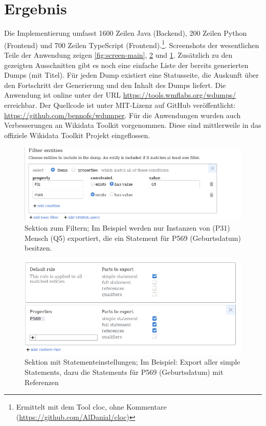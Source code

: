 \section{Ergebnis}
Die Implementierung umfasst 1600 Zeilen Java (Backend), 200 Zeilen Python (Frontend) und 700 Zeilen TypeScript (Frontend).\footnote{Ermittelt mit dem Tool cloc, ohne Kommentare (\url{https://github.com/AlDanial/cloc})}.
Screenshots der wesentlichen Teile der Anwendung zeigen \cref{fig:screen-main}, \cref{fig:screen-statements} und \cref{fig:screen-filter}.
Zusätzlich zu den gezeigten Ausschnitten gibt es noch eine einfache Liste der bereits generierten Dumps (mit Titel).
Für jeden Dump existiert eine Statusseite, die Auskunft über den Fortschritt der Generierung und den Inhalt des Dumps liefert.
Die Anwendung ist online unter der URL \url{https://tools.wmflabs.org/wdumps/} erreichbar.
Der Quellcode ist unter MIT-Lizenz auf GitHub veröffentlicht: \url{https://github.com/bennofs/wdumper}.
Für die Anwendungen wurden auch Verbesserungen an Wikidata Toolkit vorgenommen.
Diese sind mittlerweile in das offiziele Wikidata Toolkit Projekt eingeflossen.

\begin{figure}
  \includegraphics[width=\textwidth]{pics/screen-filter}
  \caption{Sektion zum Filtern; Im Beispiel werden nur Instanzen von (P31) Mensch (Q5) exportiert, die ein Statement für P569 (Geburtsdatum) besitzen.}
  \label{fig:screen-filter}
\end{figure}

\begin{figure}
  \includegraphics[width=\textwidth]{pics/screen-statements}
  \caption{Sektion mit Statementeinstellungen; Im Beispiel: Export aller simple Statements, dazu die Statements für P569 (Geburtsdatum) mit Referenzen}
  \label{fig:screen-statements}
\end{figure}

